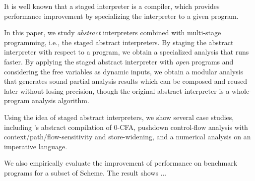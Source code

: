 It is well known that a staged interpreter is a compiler, which provides performance improvement
by specializing the interpreter to a given program.

In this paper, we study \textit{abstract} interpreters combined with multi-stage programming, i.e., the 
staged abstract interpreters. 
By staging the abstract interpreter with respect to a program, we obtain a specialized analysis that runs faster.
By applying the staged abstract interpreter with \textit{open} programs and considering the free variables as dynamic inputs, 
we obtain a modular analysis that generates sound partial analysis results which can be composed 
and reused later without losing precision, though the original abstract interpreter is a whole-program 
analysis algorithm.

Using the idea of staged abstract interpreters, we show several case studies, including 
\citeauthor{Boucher:1996:ACN:647473.727587}'s abstract compilation of  0-CFA, pushdown
control-flow analysis with context/path/flow-sensitivity and store-widening, and a numerical
analysis on an imperative language.

We also empirically evaluate the improvement of performance on benchmark programs for a subset of Scheme.
The result shows ...

